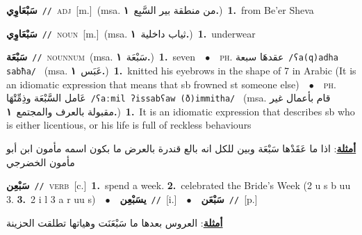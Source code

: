 \documentclass[10pt,a4paper,twoside]{article} %
\begin{document}
\begin{multicols}{2}
{{{{{{\setlength\topsep{0pt}\textbf{\foreignlanguage{arabic}{سَبْعَاوِي}}\ {\color{gray}\texttt{//}\color{black}}\ \textsc{adj}\ [m.]\ \color{gray}(msa. \foreignlanguage{arabic}{من منطقة بير السَّبِع}~\foreignlanguage{arabic}{\textbf{١.}})\color{black}\ \textbf{1.}~from Be'er Sheva\ 

{\setlength\topsep{0pt}\textbf{\foreignlanguage{arabic}{سَبْعَاوِي}}\ {\color{gray}\texttt{//}\color{black}}\ \textsc{noun}\ [m.]\ \color{gray}(msa. \foreignlanguage{arabic}{ثياب داخلية}~\foreignlanguage{arabic}{\textbf{١.}})\color{black}\ \textbf{1.}~underwear\ 

{\setlength\topsep{0pt}\textbf{\foreignlanguage{arabic}{سَبْعَة}}\ {\color{gray}\texttt{//}\color{black}}\ \textsc{noun\textunderscore num}\ \color{gray}(msa. \foreignlanguage{arabic}{سَبْعَة}~\foreignlanguage{arabic}{\textbf{١.}})\color{black}\ \textbf{1.}~seven\ \ $\bullet$\ \ \textsc{ph.} \color{gray} \foreignlanguage{arabic}{عقدهَا سبعة}\color{black}\ {\color{gray}\texttt{/{\sffamily ʕa(q)adha sabħa}/}\color{black}}\ \color{gray} (msa. \foreignlanguage{arabic}{عَبَس}~\foreignlanguage{arabic}{\textbf{١.}})\color{black}\ \textbf{1.}~knitted his eyebrows in the shape of 7 in Arabic (It is an idiomatic expression that means that sb frowned st someone else)\ \ $\bullet$\ \ \textsc{ph.} \color{gray} \foreignlanguage{arabic}{عَامل السَّبْعَة وذِمِّتْهَا}\color{black}\ {\color{gray}\texttt{/{\sffamily ʕaːmil ʔissabʕaw (ð)immitha}/}\color{black}}\ \color{gray} (msa. \foreignlanguage{arabic}{قام بأعمال غير مقبولة بالعرف والمجتمع}~\foreignlanguage{arabic}{\textbf{١.}})\color{black}\ \textbf{1.}~It is an idiomatic expression that describes sb who is either licentious, or his life is full of reckless behaviours\  \begin{flushright}\color{gray}\foreignlanguage{arabic}{\textbf{\underline{\foreignlanguage{arabic}{أمثلة}}}: اذا ما عَقَدْها سَبْعَة وبين للكل انه بالع قندرة بالعرض ما بكون اسمه مأمون ابن أبو مأمون الخضرجي}\end{flushright}\color{black}} \vspace{2mm}

{\setlength\topsep{0pt}\textbf{\foreignlanguage{arabic}{سَبْعِن}}\ {\color{gray}\texttt{//}\color{black}}\ \textsc{verb}\ [c.]\ \textbf{1.}~spend a week.  \textbf{2.}~celebrated the Bride's Week (2 u s b uu 3.  \textbf{3.}~2 i l 3 a r uu s)\ \ $\bullet$\ \ \setlength\topsep{0pt}\textbf{\foreignlanguage{arabic}{يسَبْعِن}}\ {\color{gray}\texttt{//}\color{black}}\ [i.]\ \ $\bullet$\ \ \setlength\topsep{0pt}\textbf{\foreignlanguage{arabic}{سَبْعَن}}\ {\color{gray}\texttt{//}\color{black}}\ [p.]\  \begin{flushright}\color{gray}\foreignlanguage{arabic}{\textbf{\underline{\foreignlanguage{arabic}{أمثلة}}}: العروس بعدها ما سَبْعَنَت وهياتها تطلقت الحزينة}\end{flushright}\color{black}} \vspace{2mm}

}}}}}}}
\end{multicols}
\end{document}
